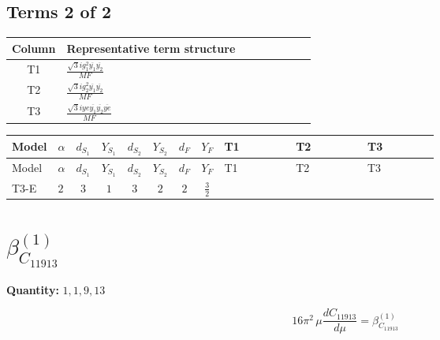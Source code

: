\documentclass[8pt]{article}
\begin{document}
\begin{landscape}
\subsection*{Terms 2 of 2}
\begin{center}
\begin{tabular}{@{}c >{\raggedright\arraybackslash}p{0.82\linewidth}@{}}
\toprule
Column & Representative term structure \\
\midrule
T1 & \(\displaystyle \frac{\sqrt{3} i g_{1}^{2} \overline{y_{1}} \overline{y_{2}}}{MF}\) \\
\midrule
T2 & \(\displaystyle \frac{\sqrt{3} i g_{2}^{2} \overline{y_{1}} \overline{y_{2}}}{MF}\) \\
\midrule
T3 & \(\displaystyle \frac{\sqrt{3} i ye \overline{y_{1}} \overline{y_{2}} \overline{ye}}{MF}\) \\
\midrule
\bottomrule
\end{tabular}
\end{center}
\smallskip
\tiny
\begin{longtable}{@{}llcccccc >{\raggedright\arraybackslash}p{0.21\linewidth} >{\raggedright\arraybackslash}p{0.21\linewidth} >{\raggedright\arraybackslash}p{0.21\linewidth}@{}}
\toprule
Model & $\alpha$ & $d_{S_1}$ & $Y_{S_1}$ & $d_{S_2}$ & $Y_{S_2}$ & $d_F$ & $Y_F$ & T1 & T2 & T3 \\
\midrule
\endfirsthead
\toprule
Model & $\alpha$ & $d_{S_1}$ & $Y_{S_1}$ & $d_{S_2}$ & $Y_{S_2}$ & $d_F$ & $Y_F$ & T1 & T2 & T3 \\
\midrule
\endhead
T3-E & $2$ & $3$ & $1$ & $3$ & $2$ & $2$ & $\frac{3}{2}$ & \scriptsize\adjustbox{max width=\linewidth}{$\begin{gathered} \frac{9 \sqrt{3} i g_{1}^{2} \overline{y_{1}} \overline{y_{2}}}{8 MF}\end{gathered}$} & \scriptsize\adjustbox{max width=\linewidth}{$\begin{gathered} \frac{11 \sqrt{3} i g_{2}^{2} \overline{y_{1}} \overline{y_{2}}}{8 MF}\end{gathered}$} & \scriptsize\adjustbox{max width=\linewidth}{$\begin{gathered} - \frac{\sqrt{3} i ye \overline{y_{1}} \overline{y_{2}} \overline{ye}}{12 MF}\end{gathered}$} \\
\midrule
\bottomrule
\end{longtable}
\clearpage
\section*{$\beta_{C_{11913}}^{(1)}$}
\noindent\textbf{Quantity: }$\mathrm{1,1,9,13}$\par\smallskip
\[16\pi^2\,\mu\frac{d C_{11913}}{d\mu}=\beta_{C_{11913}}^{(1)}\]

\end{landscape}
\end{document}
